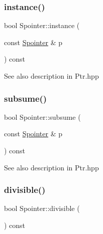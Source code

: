 \subsubsection{\texorpdfstring{instance()}{instance()}\hspace{0.1cm}{\footnotesize\ttfamily [1/5]}}
{\footnotesize\ttfamily bool Spointer\+::instance (\begin{DoxyParamCaption}\item[{const \mbox{\hyperlink{classSpointer}{Spointer}} \&}]{p }\end{DoxyParamCaption}) const\hspace{0.3cm}{\ttfamily [virtual]}}

\begin{DoxySeeAlso}{See also}
description in Ptr.\+hpp 
\end{DoxySeeAlso}
\mbox{\label{group__table_ga06fa67855bfb50d81e18bdfacce965ce}} 
\subsubsection{\texorpdfstring{subsume()}{subsume()}\hspace{0.1cm}{\footnotesize\ttfamily [1/5]}}
{\footnotesize\ttfamily bool Spointer\+::subsume (\begin{DoxyParamCaption}\item[{const \mbox{\hyperlink{classSpointer}{Spointer}} \&}]{p }\end{DoxyParamCaption}) const\hspace{0.3cm}{\ttfamily [virtual]}}

\begin{DoxySeeAlso}{See also}
description in Ptr.\+hpp 
\end{DoxySeeAlso}
\mbox{\label{group__table_ga54817fbae1688dab4dfff5724e762640}} 
\subsubsection{\texorpdfstring{divisible()}{divisible()}\hspace{0.1cm}{\footnotesize\ttfamily [1/2]}}
{\footnotesize\ttfamily bool Spointer\+::divisible (\begin{DoxyParamCaption}{ }\end{DoxyParamCaption}) const\hspace{0.3cm}{\ttfamily [virtual]}}

